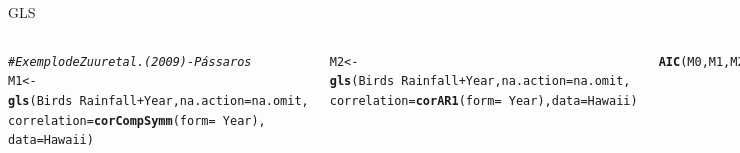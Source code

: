 \documentclass{beamer}\usepackage[]{graphicx}\usepackage[]{color}
\makeatletter
\newcommand{\hlcom}[1]{\textcolor[rgb]{0.678,0.584,0.686}{\textit{#1}}}%
\newcommand{\hlopt}[1]{\textcolor[rgb]{0,0,0}{#1}}%
\newcommand{\hlstd}[1]{\textcolor[rgb]{0.345,0.345,0.345}{#1}}%
\newcommand{\hlkwb}[1]{\textcolor[rgb]{0.69,0.353,0.396}{#1}}%
\newcommand{\hlkwc}[1]{\textcolor[rgb]{0.333,0.667,0.333}{#1}}%
\newcommand{\hlkwd}[1]{\textcolor[rgb]{0.737,0.353,0.396}{\textbf{#1}}}%
\newenvironment{kframe}{%
 \def\at@end@of@kframe{}%
 \ifinner\ifhmode%
  \def\at@end@of@kframe{\end{minipage}}%
  \begin{minipage}{\columnwidth}%
 \fi\fi%
 \def\FrameCommand##1{\hskip\@totalleftmargin \hskip-\fboxsep
 \colorbox{shadecolor}{##1}\hskip-\fboxsep
     \hskip-\linewidth \hskip-\@totalleftmargin \hskip\columnwidth}%
 \MakeFramed {\advance\hsize-\width
   \@totalleftmargin\z@ \linewidth\hsize
   \@setminipage}}%
 {\par\unskip\endMakeFramed%
 \at@end@of@kframe}
\newenvironment{knitrout}{}{} %
\renewenvironment{knitrout}{\setlength{\topsep}{0mm}}{}
\makeatother
\begin{document}
\begin{frame}[fragile]{GLS}

\begin{columns}[c]

\setlength{\topsep}{2pt}
\begin{knitrout}\tiny
{}\color{fgcolor}\begin{kframe}
\begin{alltt}
\hlcom{# Exemplo de Zuur et al. (2009) - Pássaros  }
\hlstd{M1}\hlkwb{<-}\hlkwd{gls}\hlstd{(Birds} \hlopt{~} \hlstd{Rainfall} \hlopt{+} \hlstd{Year,} \hlkwc{na.action} \hlstd{= na.omit,}
        \hlkwc{correlation} \hlstd{=} \hlkwd{corCompSymm}\hlstd{(}\hlkwc{form} \hlstd{=}\hlopt{~} \hlstd{Year),}
        \hlkwc{data}\hlstd{=Hawaii)}

\hlstd{M2}\hlkwb{<-}\hlkwd{gls}\hlstd{(Birds} \hlopt{~} \hlstd{Rainfall} \hlopt{+} \hlstd{Year,} \hlkwc{na.action} \hlstd{= na.omit,}
      \hlkwc{correlation} \hlstd{=} \hlkwd{corAR1}\hlstd{(}\hlkwc{form} \hlstd{=}\hlopt{~} \hlstd{Year),} \hlkwc{data} \hlstd{= Hawaii)}

\hlkwd{AIC}\hlstd{(M0,M1,M2)}
\end{alltt}
\begin{verbatim}
##    df      AIC
## M0  4 228.4798
## M1  5 230.4798
## M2  5 199.1394
\end{verbatim}
\end{kframe}
\end{knitrout}

\begin{knitrout}
\color{fgcolor}
\includegraphics[width=0.7\linewidth]{figure/glspt3-1} 


\end{knitrout}
\end{columns}
\end{frame}
\end{document}
